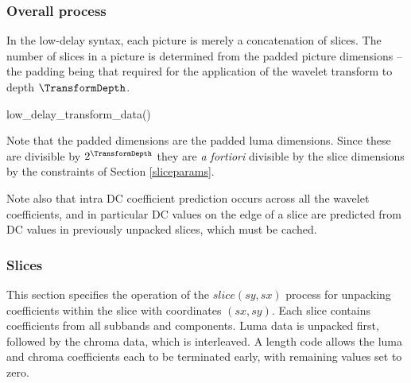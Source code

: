 \subsubsection{Overall process}
\label{ldpicture}

In the low-delay syntax, each picture is merely a concatenation of slices. 
The number of slices in a picture is determined from the padded picture dimensions
-- the padding being that required for the application of the wavelet transform to depth $\TransformDepth$.

\begin{pseudo}{low\_delay\_transform\_data()}{}
  \bsEND
\bsEND
{}
\bsEND
\end{pseudo}

Note that the padded dimensions are the padded luma dimensions. Since these are divisible 
by $2^\TransformDepth$ they are {\em a fortiori} divisible by the slice dimensions by 
the constraints of Section \ref{sliceparams}. 

Note also that intra DC coefficient prediction
occurs across all the wavelet coefficients, and in particular DC values on the edge of a slice
are predicted from DC values in previously unpacked slices, which must be cached. 

\subsubsection{Slices}
\label{sliceparsing}

This section specifies the operation of the $slice(sy,sx)$ process for unpacking coefficients
within the slice with coordinates $(sx,sy)$. Each slice
contains coefficients from all subbands and components. Luma data is unpacked first, followed by the chroma data, which
is interleaved. A length code allows the luma and chroma coefficients each to be terminated early, with remaining values
set to zero.

